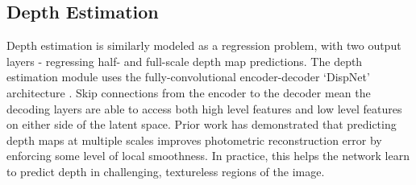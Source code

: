 

\subsection{Depth Estimation}

Depth estimation is similarly modeled as a regression problem, with two output layers - regressing half- and full-scale depth map predictions. The depth estimation module uses the fully-convolutional encoder-decoder `DispNet' architecture \cite{mayer2015dispnet}. Skip connections from the encoder to the decoder mean the decoding layers are able to access both high level features and low level features on either side of the latent space. Prior work \cite{zhou2017unsupervised} has demonstrated that predicting depth maps at multiple scales improves photometric reconstruction error by enforcing some level of local smoothness. In practice, this helps the network learn to predict depth in challenging, textureless regions of the image. 

